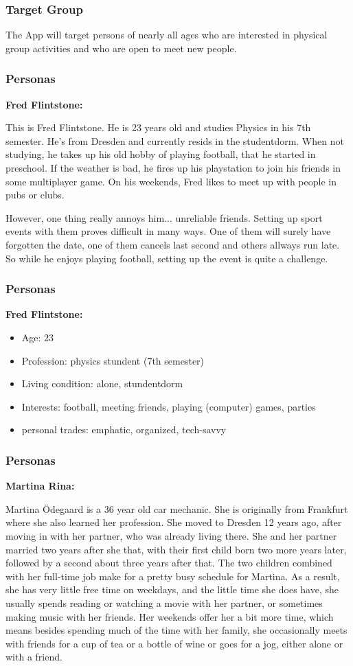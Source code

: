 \documentclass[aspectratio=169]{beamer}
\begin{document}
\begin{frame}   
\frametitle{Target Group}
The App will target persons of nearly all ages who are interested in physical group activities and who are open to meet new people. 
\end{frame}

\begin{frame}   
	\frametitle{Personas}{\textbf{Fred Flintstone:}}

	This is Fred Flintstone. He is 23 years old and studies Physics in his 7th semester. 
He's from Dresden and currently resids in the studentdorm. 
When not studying, he takes up his old hobby of playing football, that he started in preschool. If the weather is bad, he fires up his playstation to join his friends in some multiplayer game.
On his weekends, Fred likes to meet up with people in pubs or clubs.

However, one thing really annoys him... unreliable friends. Setting up sport events with them proves difficult in many ways.
One of them will surely have forgotten the date, one of them cancels last second and others allways run late.
So while he enjoys playing football, setting up the event is quite a challenge.
\end{frame}

\begin{frame}   
	\frametitle{Personas}{\textbf{Fred Flintstone:}}

	\begin{itemize}
		\item Age: 23
		\item Profession: physics stundent (7th semester)
		\item Living condition: alone, stundentdorm
		\item Interests: football, meeting friends, playing (computer) games, parties
		\item personal trades: emphatic, organized, tech-savvy
\end{itemize}


\end{frame}

\begin{frame}   
	\frametitle{Personas}{\textbf{Martina Rina:}}

	Martina Ödegaard is a 36 year old car mechanic. She is originally from Frankfurt where she also learned her profession. She moved to Dresden 12 years ago, after moving in with her partner, who was already living there. She and her partner married two years after she that, with their first child born two more years later, followed by a second about three years after that. The two children combined with her full-time job make for a pretty busy schedule for Martina. As a result, she has very little free time on weekdays, and the little time she does have, she usually spends reading or watching a movie with her partner, or sometimes making music with her friends. Her weekends offer her a bit more time, which means besides spending much of the time with her family, she occasionally meets with friends for a cup of tea or a bottle of wine or goes for a jog, either alone or with a friend. 
  
\end{frame}
\end{document}
